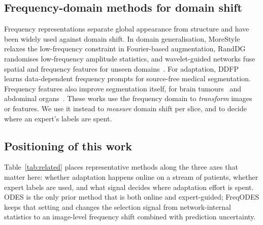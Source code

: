 \documentclass[a4paper,fleqn]{cas-dc}
\begin{document}
\subsection{Frequency-domain methods for domain shift}
Frequency representations separate global appearance from structure and have been widely used against domain shift. In domain generalisation, MoreStyle~\cite{zhao2024morestyle} relaxes the low-frequency constraint in Fourier-based augmentation, RandDG~\cite{wu2025randdg} randomises low-frequency amplitude statistics, and wavelet-guided networks fuse spatial and frequency features for unseen domains~\cite{pan2025wgsf,wang2026wavernet}. For adaptation, DDFP~\cite{yin2025ddfp} learns data-dependent frequency prompts for source-free medical segmentation. Frequency features also improve segmentation itself, for brain tumours~\cite{shao2025brainfreq} and abdominal organs~\cite{han2025abdominalfreq}. These works use the frequency domain to \emph{transform} images or features. We use it instead to \emph{measure} domain shift per slice, and to decide where an expert's labels are spent.

\subsection{Positioning of this work}
Table~\ref{tab:related} places representative methods along the three axes that matter here: whether adaptation happens online on a stream of patients, whether expert labels are used, and what signal decides where adaptation effort is spent. ODES is the only prior method that is both online and expert-guided; FreqODES keeps that setting and changes the selection signal from network-internal statistics to an image-level frequency shift combined with prediction uncertainty.
\end{document}
